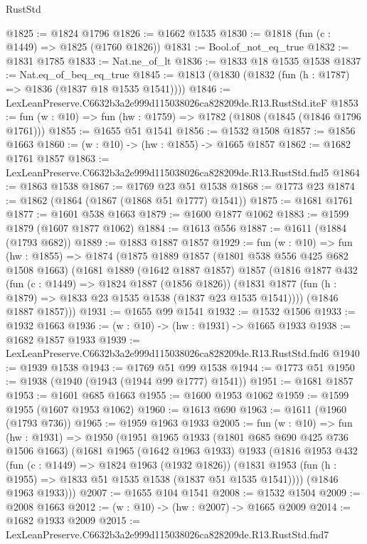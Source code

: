 \begin{lexlean}{RustStd}
\begin{coremodule}
@1825 := @1824 @1796
@1826 := @1662 @1535
@1830 := @1818 (fun (c : @1449) => @1825 (@1760 @1826))
@1831 := Bool.of_not_eq_true
@1832 := @1831 @1785
@1833 := Nat.ne_of_lt
@1836 := @1833 @18 @1535 @1538
@1837 := Nat.eq_of_beq_eq_true
@1845 := @1813 (@1830 (@1832 (fun (h : @1787) => @1836 (@1837 @18 @1535 @1541))))
@1846 := LexLeanPreserve.C6632b3a2e999d115038026ca828209de.R13.RustStd.iteF
@1853 := fun (w : @10) => fun (hw : @1759) => @1782 (@1808 (@1845 (@1846 @1796 @1761)))
@1855 := @1655 @51 @1541
@1856 := @1532 @1508
@1857 := @1856 @1663
@1860 := (w : @10) -> (hw : @1855) -> @1665 @1857
@1862 := @1682 @1761 @1857
@1863 := LexLeanPreserve.C6632b3a2e999d115038026ca828209de.R13.RustStd.fnd5
@1864 := @1863 @1538
@1867 := @1769 @23 @51 @1538
@1868 := @1773 @23
@1874 := @1862 (@1864 (@1867 (@1868 @51 @1777) @1541))
@1875 := @1681 @1761
@1877 := @1601 @538 @1663
@1879 := @1600 @1877 @1062
@1883 := @1599 @1879 (@1607 @1877 @1062)
@1884 := @1613 @556
@1887 := @1611 (@1884 (@1793 @682))
@1889 := @1883 @1887 @1857
@1929 := fun (w : @10) =>
  fun (hw : @1855) =>
  @1874
    (@1875
      @1889
      @1857
      (@1801 @538 @556 @425 @682 @1508 @1663)
      (@1681
        @1889
        (@1642 @1887 @1857)
        @1857
        (@1816
          @1877
          @432
          (fun (c : @1449) => @1824 @1887 (@1856 @1826))
          (@1831 @1877 (fun (h : @1879) => @1833 @23 @1535 @1538 (@1837 @23 @1535 @1541))))
        (@1846 @1887 @1857)))
@1931 := @1655 @99 @1541
@1932 := @1532 @1506
@1933 := @1932 @1663
@1936 := (w : @10) -> (hw : @1931) -> @1665 @1933
@1938 := @1682 @1857 @1933
@1939 := LexLeanPreserve.C6632b3a2e999d115038026ca828209de.R13.RustStd.fnd6
@1940 := @1939 @1538
@1943 := @1769 @51 @99 @1538
@1944 := @1773 @51
@1950 := @1938 (@1940 (@1943 (@1944 @99 @1777) @1541))
@1951 := @1681 @1857
@1953 := @1601 @685 @1663
@1955 := @1600 @1953 @1062
@1959 := @1599 @1955 (@1607 @1953 @1062)
@1960 := @1613 @690
@1963 := @1611 (@1960 (@1793 @736))
@1965 := @1959 @1963 @1933
@2005 := fun (w : @10) =>
  fun (hw : @1931) =>
  @1950
    (@1951
      @1965
      @1933
      (@1801 @685 @690 @425 @736 @1506 @1663)
      (@1681
        @1965
        (@1642 @1963 @1933)
        @1933
        (@1816
          @1953
          @432
          (fun (c : @1449) => @1824 @1963 (@1932 @1826))
          (@1831 @1953 (fun (h : @1955) => @1833 @51 @1535 @1538 (@1837 @51 @1535 @1541))))
        (@1846 @1963 @1933)))
@2007 := @1655 @104 @1541
@2008 := @1532 @1504
@2009 := @2008 @1663
@2012 := (w : @10) -> (hw : @2007) -> @1665 @2009
@2014 := @1682 @1933 @2009
@2015 := LexLeanPreserve.C6632b3a2e999d115038026ca828209de.R13.RustStd.fnd7

\end{coremodule}
\end{lexlean}

